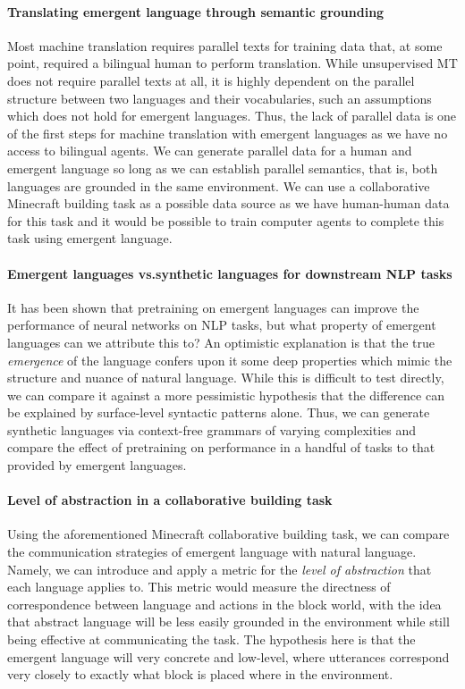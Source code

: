 \paragraph{Translating emergent language through semantic grounding}
Most machine translation requires parallel texts for training data that, at some point, required a bilingual human to perform translation.
While unsupervised MT does not require parallel texts at all, it is highly dependent on the parallel structure between two languages and their vocabularies, such an assumptions which does not hold for emergent languages.
Thus, the lack of parallel data is one of the first steps for machine translation with emergent languages as we have no access to bilingual agents.
We can generate parallel data for a human and emergent language so long as we can establish parallel semantics, that is, both languages are grounded in the same environment.
We can use a collaborative Minecraft building task as a possible data source as we have human-human data for this task and it would be possible to train computer agents to complete this task using emergent language.

\paragraph{Emergent languages vs.\@ synthetic languages for downstream NLP tasks}
It has been shown that pretraining on emergent languages can improve the performance of neural networks on NLP tasks, but what property of emergent languages can we attribute this to?
An optimistic explanation is that the true \emph{emergence} of the language confers upon it some deep properties which mimic the structure and nuance of natural language.
While this is difficult to test directly, we can compare it against a more pessimistic hypothesis that the difference can be explained by surface-level syntactic patterns alone.
Thus, we can generate synthetic languages via context-free grammars of varying complexities and compare the effect of pretraining on performance in a handful of tasks to that provided by emergent languages.

\paragraph{Level of abstraction in a collaborative building task}
Using the aforementioned Minecraft collaborative building task, we can compare the communication strategies of emergent language with natural language.
Namely, we can introduce and apply a metric for the \emph{level of abstraction} that each language applies to.
This metric would measure the directness of correspondence between language and actions in the block world, with the idea that abstract language will be less easily grounded in the environment while still being effective at communicating the task.
The hypothesis here is that the emergent language will very concrete and low-level, where utterances correspond very closely to exactly what block is placed where in the environment.

